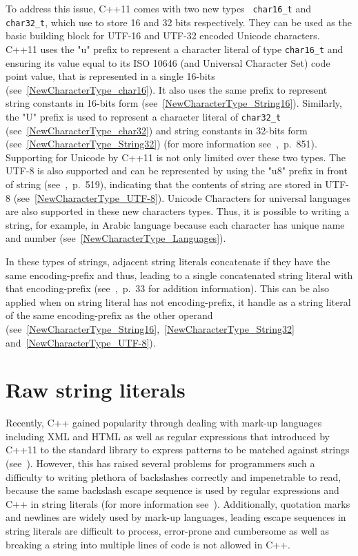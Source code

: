 \documentclass[11pt]{report}
\begin{document}
To address this issue, C++11 comes with two new types \texttt{ char16\_t} and \texttt{char32\_t}, which use to store 16 and 32 bits respectively. They can be used as the basic building block for UTF-16 and UTF-32 encoded Unicode characters. C++11 uses the "u" prefix to represent a character literal of type \texttt{char16\_t} and ensuring its value equal to its ISO 10646 (and Universal Character Set) code point value, that is represented in a single 16-bits (see~\ref{NewCharacterType_char16}). It also uses the same prefix to represent string constants in 16-bits form (see~\ref{NewCharacterType_String16}). Similarly, the "U" prefix is used to represent a character literal of \texttt{char32\_t} (see~\ref{NewCharacterType_char32}) and string constants in 32-bits form (see~\ref{NewCharacterType_String32}) (for more information see~\cite{Josuttis:2012:CppStandard},~p.~851). Supporting for Unicode by C++11 is not only limited over these two types. The UTF-8 is also supported and can be represented by using the "u8" prefix in front of string (see~\cite{Gregorie:professionalcpp},~p.~519), indicating that the contents of string are stored in UTF-8 (see~\ref{NewCharacterType_UTF-8}). Unicode Characters for universal languages are also supported in these new characters types. Thus, it is possible to writing a string, for example, in Arabic language because each character has unique name and number (see~\ref{NewCharacterType_Languages}).

In these types of strings, adjacent string literals concatenate if they have the same encoding-prefix and thus, leading to a single concatenated string literal with that encoding-prefix (see~\cite{ ISO:2011:Cpplanguage},~p.~33 for addition information). This can be also applied when on string literal has not encoding-prefix, it handle as a string literal of the same encoding-prefix as the other operand (see~\ref{NewCharacterType_String16},~\ref{NewCharacterType_String32} and~\ref{NewCharacterType_UTF-8}).


\section{Raw string literals}
\label{section: Raw string literals}
Recently, C++ gained popularity through dealing with mark-up languages including XML and HTML as well as regular expressions that introduced by C++11 to the standard library to express patterns to be matched against strings (see~\cite{Stroustrup:2012:Cpp11}). However, this has raised several problems for programmers such a difficulty to writing plethora of backslashes correctly and impenetrable to read, because the same backslash escape sequence is used by regular expressions and C++ in string literals (for more information see~\cite{Stroustrup:2012:Cpp11}). Additionally, quotation marks and newlines are widely used by mark-up languages, leading escape sequences in string literals are difficult to process, error-prone and cumbersome as well as breaking a string into multiple lines of code is not allowed in C++.
\end{document}
